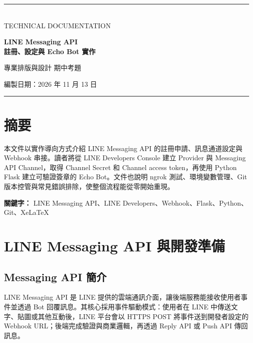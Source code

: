\documentclass[12pt,a4paper]{report}
\begin{document}
\begin{titlepage}
  \centering
  \vspace*{1.4cm}
  {\color{linegreen}\rule{0.8\linewidth}{3pt}}\\[1.2cm]
  {\color{linegreen!55!black}\Large TECHNICAL DOCUMENTATION}\par
  \vspace{0.35cm}
  {\Huge\bfseries LINE Messaging API\\[0.35cm]註冊、設定與 Echo Bot 實作}\par
  \vspace{1.1cm}
  {\Large 專業排版與設計 期中考題}\par
  \vfill
  \vfill
  {\large 編製日期：2026 年 11 月 13 日}\par
  \vspace{0.4cm}
  {\color{linegreen}\rule{0.8\linewidth}{3pt}}
\end{titlepage}

\chapter*{摘要}
本文件以實作導向方式介紹 LINE Messaging API 的註冊申請、訊息通道設定與 Webhook 串接。讀者將從 LINE Developers Console 建立 Provider 與 Messaging API Channel，取得 Channel Secret 和 Channel access token，再使用 Python Flask 建立可驗證簽章的 Echo Bot。文件也說明 ngrok 測試、環境變數管理、Git 版本控管與常見錯誤排除，使整個流程能從零開始重現。

\textbf{關鍵字：} LINE Messaging API、LINE Developers、Webhook、Flask、Python、Git、XeLaTeX

\tableofcontents
\listoffigures
\listoftables
\lstlistoflistings
\clearpage
{}

\chapter{LINE Messaging API 與開發準備}
\section{Messaging API 簡介}
LINE Messaging API 是 LINE 提供的雲端通訊介面，讓後端服務能接收使用者事件並透過 Bot 回覆訊息。其核心採用事件驅動模式：使用者在 LINE 中傳送文字、貼圖或其他互動後，LINE 平台會以 HTTPS POST 將事件送到開發者設定的 Webhook URL；後端完成驗證與商業邏輯，再透過 Reply API 或 Push API 傳回訊息。
\end{document}
